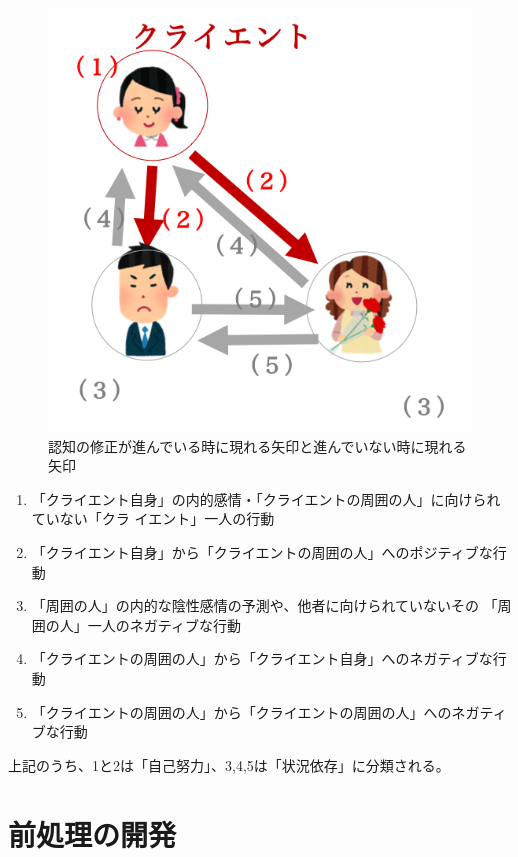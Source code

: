 \documentclass[shuuron]{kuee}
\begin{document}
\begin{figure}
  \begin{center}
    \includegraphics[width=\linewidth]{arrow.png}
  \end{center}
  \caption{認知の修正が進んでいる時に現れる矢印と進んでいない時に現れる矢印}
  \label{fig:arrow}
\end{figure}

\begin{enumerate}
  \item 「クライエント自身」の内的感情・「クライエントの周囲の人」に向けられていない「クラ
  イエント」一人の行動
  \item 「クライエント自身」から「クライエントの周囲の人」へのポジティブな行動


  \item 「周囲の人」の内的な陰性感情の予測や、他者に向けられていないその
  「周囲の人」一人のネガティブな行動
  \item 「クライエントの周囲の人」から「クライエント自身」へのネガティブな行動
  \item 「クライエントの周囲の人」から「クライエントの周囲の人」へのネガティブな行動

\end{enumerate}
上記のうち、1と2は「自己努力」、3,4,5は「状況依存」に分類される。


\section{前処理の開発}
\end{document}
